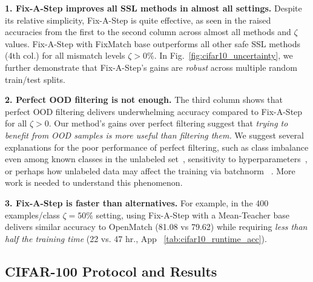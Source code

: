 \textbf{1. Fix-A-Step improves all SSL methods in almost all settings.}
Despite its relative simplicity, Fix-A-Step is quite effective, as seen in the raised accuracies from the first to the second column across almost all methods and $\zeta$ values.
Fix-A-Step with FixMatch base outperforms all other safe SSL methods (4th col.) for all mismatch levels $\zeta > 0\%$.
In Fig.~\ref{fig:cifar10_uncertainty}, we further demonstrate that Fix-A-Step's gains are \emph{robust} across multiple random train/test splits.

\textbf{2. Perfect OOD filtering is not enough.}
The third column shows that perfect OOD filtering delivers underwhelming accuracy compared to Fix-A-Step for all $\zeta>0$. 
Our method's gains over perfect filtering suggest that \textit{trying to benefit from OOD samples is more useful than filtering them.}
We suggest several explanations for the poor performance of perfect filtering, such as 
class imbalance even among known classes in the unlabeled set~\citep{kim2020distribution,lai2022smoothed}, %
sensitivity to hyperparameters~\citep{su2021realistic,sohnFixMatchSimplifyingSemisupervised2020}, %
or perhaps how unlabeled data may affect the training via batchnorm ~\citep{zhao2020robust}. 
More work is needed to understand this phenomenon.

\textbf{3. Fix-A-Step is faster than alternatives.}
For example, in the 400 examples/class $\zeta=50\%$ setting, using Fix-A-Step with a Mean-Teacher base delivers similar accuracy to OpenMatch (81.08 vs 79.62) while requiring \emph{less than half the training time} (22 vs. 47 hr., App ~\ref{tab:cifar10_runtime_acc}).

\subsection{CIFAR-100 Protocol and Results}



